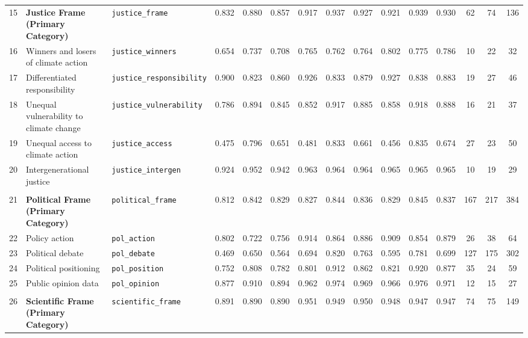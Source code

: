 \begin{longtable}{p{0.4cm}p{4.0cm}p{3.0cm}cccccccccccc}
\midrule
15 & \textbf{Justice Frame\newline (Primary Category)} & \texttt{justice\_frame} & 0.832 & 0.880 & 0.857 & 0.917 & 0.937 & 0.927 & 0.921 & 0.939 & 0.930 & 62 & 74 & 136 \\
\cmidrule(lr){1-15}
16 & Winners and losers of climate action & \texttt{justice\_winners} & 0.654 & 0.737 & 0.708 & 0.765 & 0.762 & 0.764 & 0.802 & 0.775 & 0.786 & 10 & 22 & 32 \\
17 & Differentiated responsibility & \texttt{justice\_responsibility} & 0.900 & 0.823 & 0.860 & 0.926 & 0.833 & 0.879 & 0.927 & 0.838 & 0.883 & 19 & 27 & 46 \\
18 & Unequal vulnerability to climate change & \texttt{justice\_vulnerability} & 0.786 & 0.894 & 0.845 & 0.852 & 0.917 & 0.885 & 0.858 & 0.918 & 0.888 & 16 & 21 & 37 \\
19 & Unequal access to climate action & \texttt{justice\_access} & 0.475 & 0.796 & 0.651 & 0.481 & 0.833 & 0.661 & 0.456 & 0.835 & 0.674 & 27 & 23 & 50 \\
20 & Intergenerational justice & \texttt{justice\_intergen} & 0.924 & 0.952 & 0.942 & 0.963 & 0.964 & 0.964 & 0.965 & 0.965 & 0.965 & 10 & 19 & 29 \\
\midrule
\rowcolor{gray!8}
\multicolumn{15}{l}{\textit{Political Frame}} \\
\midrule
21 & \textbf{Political Frame\newline (Primary Category)} & \texttt{political\_frame} & 0.812 & 0.842 & 0.829 & 0.827 & 0.844 & 0.836 & 0.829 & 0.845 & 0.837 & 167 & 217 & 384 \\
\cmidrule(lr){1-15}
22 & Policy action & \texttt{pol\_action} & 0.802 & 0.722 & 0.756 & 0.914 & 0.864 & 0.886 & 0.909 & 0.854 & 0.879 & 26 & 38 & 64 \\
23 & Political debate & \texttt{pol\_debate} & 0.469 & 0.650 & 0.564 & 0.694 & 0.820 & 0.763 & 0.595 & 0.781 & 0.699 & 127 & 175 & 302 \\
24 & Political positioning & \texttt{pol\_position} & 0.752 & 0.808 & 0.782 & 0.801 & 0.912 & 0.862 & 0.821 & 0.920 & 0.877 & 35 & 24 & 59 \\
25 & Public opinion data & \texttt{pol\_opinion} & 0.877 & 0.910 & 0.894 & 0.962 & 0.974 & 0.969 & 0.966 & 0.976 & 0.971 & 12 & 15 & 27 \\
\midrule
\rowcolor{gray!8}
\multicolumn{15}{l}{\textit{Scientific Frame}} \\
\midrule
26 & \textbf{Scientific Frame\newline (Primary Category)} & \texttt{scientific\_frame} & 0.891 & 0.890 & 0.890 & 0.951 & 0.949 & 0.950 & 0.948 & 0.947 & 0.947 & 74 & 75 & 149 \\

\end{longtable}
